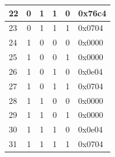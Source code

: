 \begin{table}[]
\begin{tabular}{|l|c|c|c|c|l|}
22                           & 0                       & 1                & 1                & 0                   & 0x76c4                         \\ \hline
23                           & 0                       & 1                & 1                & 1                   & 0x0704                         \\ \hline
24                           & 1                       & 0                & 0                & 0                   & 0x0000                         \\ \hline
25                           & 1                       & 0                & 0                & 1                   & 0x0000                         \\ \hline
26                           & 1                       & 0                & 1                & 0                   & 0x0e04                         \\ \hline
27                           & 1                       & 0                & 1                & 1                   & 0x0704                         \\ \hline
28                           & 1                       & 1                & 0                & 0                   & 0x0000                         \\ \hline
29                           & 1                       & 1                & 0                & 1                   & 0x0000                         \\ \hline
30                           & 1                       & 1                & 1                & 0                   & 0x0e04                         \\ \hline
31                           & 1                       & 1                & 1                & 1                   & 0x0704                         \\ \hline
\end{tabular}
\end{table}


